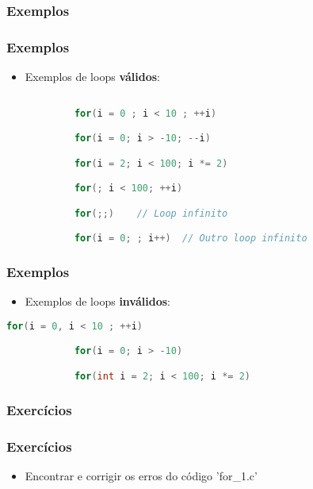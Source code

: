 \subsubsection{Exemplos}

\begin{frame}[fragile]
    \frametitle{Exemplos}
    
        \begin{itemize}
            
            \item Exemplos de loops \textbf{válidos}:
    
        \end{itemize}
    
        \begin{lstlisting}[language=C]
    
            for(i = 0 ; i < 10 ; ++i)

            for(i = 0; i > -10; --i)

            for(i = 2; i < 100; i *= 2)

            for(; i < 100; ++i)

            for(;;)    // Loop infinito

            for(i = 0; ; i++)  // Outro loop infinito
        \end{lstlisting}
    
\end{frame}



\begin{frame}[fragile]
    \frametitle{Exemplos}
    
        \begin{itemize}
            
            \item Exemplos de loops \textbf{inválidos}:
    
        \end{itemize}
    
        \begin{lstlisting}[language=C]
            for(i = 0, i < 10 ; ++i)

            for(i = 0; i > -10)

            for(int i = 2; i < 100; i *= 2)
        \end{lstlisting}
    
\end{frame}



\subsubsection{Exercícios}

\begin{frame}[fragile]
\frametitle{Exercícios}
    
    \begin{itemize}
        
        \item Encontrar e corrigir os erros do código 'for\_1.c'

    \end{itemize}
    
\end{frame}